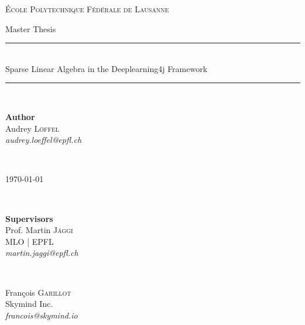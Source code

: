 \begin{titlepage}
	\newcommand{\HRule}{\rule{\linewidth}{0.5mm}} %
	\center
	
\LARGE \textsc{École Polytechnique Fédérale de Lausanne}
\vspace{1cm}

\LARGE Master Thesis
\vspace{2cm}
	
	{ 
		\HRule \\[0.5cm]
		\Huge Sparse Linear Algebra in the Deeplearning4j Framework} %
	\HRule \\[1cm]
	
	\vspace{2cm}
	\begin{minipage}[t]{0.4\textwidth}
		\begin{flushleft} \large
			\textbf{Author} \\
			Audrey \textsc{Löffel}\\ 
			\textit{audrey.loeffel@epfl.ch}
		\end{flushleft}
	\end{minipage}
	~
	\begin{minipage}[t]{0.4\textwidth}
		\begin{flushright} \large
				{\large \today}	
		\end{flushright} 
	\end{minipage}\\[1cm]
	
	\begin{minipage}[t]{0.4\textwidth}
		\begin{flushleft} \large
		\textbf{Supervisors} \\
			Prof. Martin \textsc{Jäggi}\\
			MLO | EPFL \\
			\textit{martin.jaggi@epfl.ch}
			\end{flushleft}
	\end{minipage}
	~
	\begin{minipage}[t]{0.4\textwidth}
		\begin{flushright} \large
		
	\vspace{0.3cm}
			François \textsc{Garillot}\\ 
			Skymind Inc.\\
			\textit{francois@skymind.io}
			

\end{flushright}
\end{minipage}
\end{titlepage}
